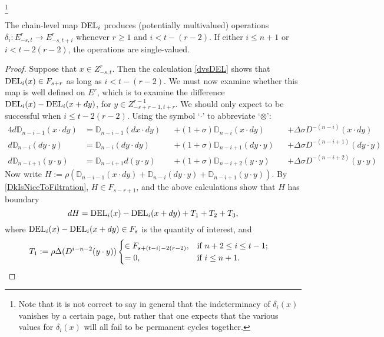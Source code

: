 \documentclass[10pt]{article}
\newcommand{\twist}{\sigma}
\begin{document}
\begin{AdamsSSEQ operations final}
\footnote{Note that it is not correct to say in general that the indeterminacy of $\delta_i(x)$ vanishes by a certain page, but rather that one expects that the various values for $\delta_i(x)$ will all fail to be permanent cycles together.}
\begin{prop}
The chain-level map $\textup{DEL}_i$ produces (potentially multivalued) operations $\delta_i:E^r_{-s,t}\to E^r_{-s,t+i}$ whenever $r\geq1$ and $i<t-(r-2)$. If either $i\leq n+1$ or $i<t-2(r-2)$, the operations are single-valued.
\end{prop}
\begin{proof}
Suppose that $x\in Z^r_{-s,t}$. Then the calculation \ref{dvsDEL} shows that $\textup{DEL}_i(x)\in F_{s+r}$ as long as $i<t-(r-2)$. We must now examine whether this map is well defined on $E^r$, which is to examine the difference $\textup{DEL}_i(x)-\textup{DEL}_i(x+dy)$, for $y\in Z^{r-1}_{-s+r-1,t+r}$. We should only expect to be successful when $i\leq t-2(r-2)$.
Using the symbol `$\cdot$' to abbreviate `$\otimes$':
\small
\begin{alignat*}{4}
d\mathbb{D}_{n-i-1}(x\cdot dy)&=
{\mathbb{D}_{n-i-1}(dx\cdot dy)}&&+
(1{+}\twist)\mathbb{D}_{n-i}(x\cdot dy)&&+
\Delta\twist D^{-(n-i)}(x\cdot dy)\\
d\mathbb{D}_{n-i}(dy\cdot y)&=
\mathbb{D}_{n-i}(dy\cdot dy)&&+
(1{+}\twist)\mathbb{D}_{n-i+1}(dy\cdot y)&&+
\Delta\twist D^{-(n-i+1)}(dy\cdot y)\\
d\mathbb{D}_{n-i+1}(y\cdot y)&=
\mathbb{D}_{n-i+1}d(y\cdot y)&&+
{(1{+}\twist)\mathbb{D}_{n-i+2}(y\cdot y)}&&+
\Delta\twist D^{-(n-i+2)}(y\cdot y)
\end{alignat*}
\normalsize
Now write $H:=\rho(\mathbb{D}_{n-i-1}(x\cdot dy)+\mathbb{D}_{n-i}(dy\cdot y)+\mathbb{D}_{n-i+1}(y\cdot y))$. By \ref{DkIsNiceToFiltration}, $H\in F_{s-r+1}$, and the above calculations show that $H$ has boundary
\small
\[dH=\textup{DEL}_i(x)-\textup{DEL}_i(x+dy)+T_1+T_2+T_3,\]
\normalsize
where $\textup{DEL}_i(x)-\textup{DEL}_i(x+dy)\in F_s$ is the quantity of interest, and
\begin{align*}
T_1:=\rho\Delta(D^{i-n-2}(y\cdot y))&\begin{cases}
\in F_{s+(t-i)-2(r-2)},&\textup{if }n+2\leq i\leq t-1;\\
=0,&\textup{if }i\leq n+1.
\end{cases}

\end{align*}
\end{proof}
\end{AdamsSSEQ operations final}
\end{document}
